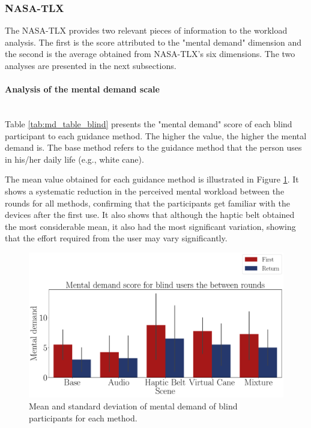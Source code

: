 \subsubsection{NASA-TLX}
\label{subsubsec:results_nasa_tlx_1}

The NASA-TLX provides two relevant pieces of information to the workload analysis. The first is the score attributed to the "mental demand" dimension and the second is the average obtained from NASA-TLX's six dimensions. The two analyses are presented in the next subsections.

\paragraph{Analysis of the mental demand scale}\mbox{}\\

Table \ref{tab:md_table_blind} presents the "mental demand" score of each blind participant to each guidance method. The higher the value, the higher the mental demand is. The base method refers to the guidance method that the person uses in his/her daily life (e.g., white cane). 



The mean value obtained for each guidance method is illustrated in Figure \ref{fig:barplot_md_avg_5_scene_blind}. It shows a systematic reduction in the perceived mental workload between the rounds for all methods, confirming that the participants get familiar with the devices after the first use. It also shows that although the haptic belt obtained the most considerable mean, it also had the most significant variation, showing that the effort required from the user may vary significantly.

\begin{figure}[!htb]
    \centering
    \includegraphics[width = \textwidth]{Resultados/Nasa/Figuras/pdf/barplot_md_avg_5_scene_blind.pdf}
    \caption{Mean and standard deviation of mental demand of blind participants for each method.}
    \label{fig:barplot_md_avg_5_scene_blind}
\end{figure}


